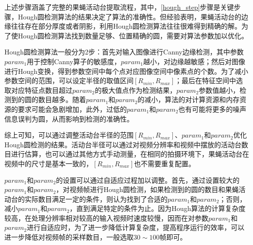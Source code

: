 上述步骤涵盖了完整的果蝇活动台提取流程，其中，\ref{hough_step}步骤是关键步骤，Hough圆检测算法的结果决定了算法的准确性。但经验表明，果蝇活动台的边缘往往存在部分厚度或者阴影，利用Hough圆检测算法往往很难得到精确的解。为了使Hough圆检测算法找到数量足够、位置精确的圆，需要对算法参数加以优化。

Hough圆检测算法一般分为2步：首先对输入图像进行Canny边缘检测，其中参数$param_1$用于控制Canny算子的敏感度，$param_1$越小，对边缘越敏感；然后对图像进行Hough变换，得到参数空间中每个点对应图像空间中像素点的个数。为了减小参数空间的范围，可以设定半径的取值区间$[R_{min}, R_{max}]$；最后在特征空间中选取对应特征点数目超过$param_2$的极大值点作为检测结果，$param_2$参数值越小，检测到的圆的数目越多。随着$param_1$和$param_2$的减小，算法的对计算资源和内存资源的要求可能会急剧增加，此外，过低的$param_1$和$param_2$也有可能将更多的噪声信息误判为圆，从而影响到检测的准确性。

综上可知，可以通过调整活动台半径的范围$[R_{min}, R_{max}]$、$param_1$和$param_2$优化Hough圆检测的结果。活动台半径可以通过对视频分辨率和视频中摆放的活动台数目进行估算，也可以通过其他方式手动测量，在相同的拍摄环境下，果蝇活动台在视频中的尺寸是基本一致的，$[R_{min}, R_{max}]$也不需要重复配置。

$param_1$和$param_2$的设置可以通过自适应过程加以调整。首先，通过设置较大的$param_1$和$param_2$，对视频帧进行Hough圆检测，如果检测到的圆的数目和果蝇活动台的实际数目满足一定的条件，则认为找到了合适的$param_1$和$param_2$；否则，减小$param_1$和$param_2$，直到满足特定的条件为止。因为Hough算法的计算复杂度较高，在处理分辨率相对较高的输入视频时速度较慢，因而在对参数$param_1$和$param_2$进行自适应时，为了进一步降低计算复杂度，提高程序运行的效率，可以进一步降低对视频帧的采样数目，一般选取$30\sim 100$帧即可。

